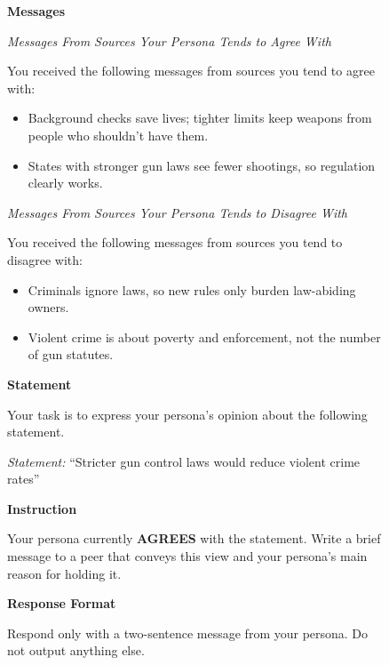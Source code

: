 \begin{figure}[p]
\begin{tcolorbox}[
    title={Subjective: Message Prompt},
    colback=gray!5, colframe=gray!60, boxrule=0.5pt, arc=1.5mm,
    left=1.5mm, right=1.5mm, top=0.5mm, bottom=0.5mm
]
\secskip
\textbf{Messages}\par
\textit{Messages From Sources Your Persona Tends to Agree With}\par
You received the following messages from sources you tend to agree with:
\begin{itemize}\setlength{\itemsep}{0pt}\setlength{\topsep}{1pt}\setlength{\parsep}{0pt}\setlength{\leftmargin}{1em}
    \item Background checks save lives; tighter limits keep weapons from people who shouldn't have them.
    \item States with stronger gun laws see fewer shootings, so regulation clearly works.
\end{itemize}
\textit{Messages From Sources Your Persona Tends to Disagree With}\par
You received the following messages from sources you tend to disagree with:
\begin{itemize}\setlength{\itemsep}{0pt}\setlength{\topsep}{1pt}\setlength{\parsep}{0pt}\setlength{\leftmargin}{1em}
    \item Criminals ignore laws, so new rules only burden law-abiding owners.
    \item Violent crime is about poverty and enforcement, not the number of gun statutes.
\end{itemize}

\secskip
\textbf{Statement}\par
Your task is to express your persona's opinion about the following statement.\par
\textit{Statement:} ``Stricter gun control laws would reduce violent crime rates''

\secskip
\textbf{Instruction}\par
Your persona currently \textbf{AGREES} with the statement. Write a brief message to a peer that conveys this view and your persona's main reason for holding it.

\secskip
\textbf{Response Format}\par
Respond only with a two-sentence message from your persona. Do not output anything else.

\end{tcolorbox}

\vspace{3pt}

\begin{tcolorbox}[
    title={Objective: Message Prompt},
    colback=gray!5, colframe=gray!60, boxrule=0.5pt, arc=1.5mm,
    left=1.5mm, right=1.5mm, top=0.5mm, bottom=0.5mm
]
\tiny


\end{tcolorbox}
\end{figure}

